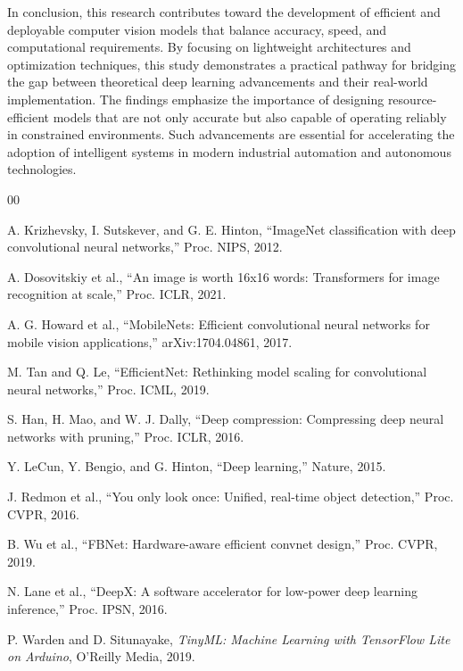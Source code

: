 \documentclass[conference]{IEEEtran}
\begin{document}
In conclusion, this research contributes toward the development of efficient and deployable computer vision models that balance accuracy, speed, and computational requirements. By focusing on lightweight architectures and optimization techniques, this study demonstrates a practical pathway for bridging the gap between theoretical deep learning advancements and their real-world implementation. The findings emphasize the importance of designing resource-efficient models that are not only accurate but also capable of operating reliably in constrained environments. Such advancements are essential for accelerating the adoption of intelligent systems in modern industrial automation and autonomous technologies.

\begin{thebibliography}{00}

 A. Krizhevsky, I. Sutskever, and G. E. Hinton, ``ImageNet classification with deep convolutional neural networks,'' Proc. NIPS, 2012.

 A. Dosovitskiy et al., ``An image is worth 16x16 words: Transformers for image recognition at scale,'' Proc. ICLR, 2021.

 A. G. Howard et al., ``MobileNets: Efficient convolutional neural networks for mobile vision applications,'' arXiv:1704.04861, 2017.

 M. Tan and Q. Le, ``EfficientNet: Rethinking model scaling for convolutional neural networks,'' Proc. ICML, 2019.

 S. Han, H. Mao, and W. J. Dally, ``Deep compression: Compressing deep neural networks with pruning,'' Proc. ICLR, 2016.

 Y. LeCun, Y. Bengio, and G. Hinton, ``Deep learning,'' Nature, 2015.

 J. Redmon et al., ``You only look once: Unified, real-time object detection,'' Proc. CVPR, 2016.

 B. Wu et al., ``FBNet: Hardware-aware efficient convnet design,'' Proc. CVPR, 2019.

 N. Lane et al., ``DeepX: A software accelerator for low-power deep learning inference,'' Proc. IPSN, 2016.

 P. Warden and D. Situnayake, \textit{TinyML: Machine Learning with TensorFlow Lite on Arduino}, O'Reilly Media, 2019.

\end{thebibliography}
\end{document}
